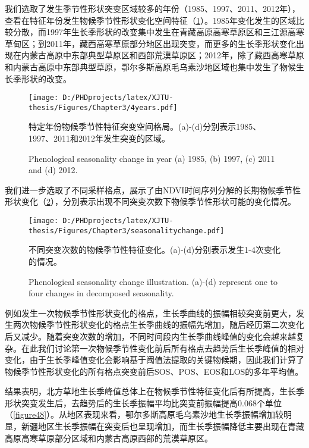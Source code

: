 我们选取了发生季节性形状突变区域较多的年份（1985、1997、2011、2012年），查看在特征年份发生物候季节性形状变化空间特征（\cref{figure46}）。1985年变化发生的区域比较分散，而1997年生长季形状的改变集中发生在青藏高原高寒草原区和三江源高寒草甸区；到2011年，藏西高寒草原部分地区出现突变，而更多的生长季形状变化出现在内蒙古高原中东部典型草原区和西部荒漠草原区；2012年，除了藏西高寒草原和内蒙古高原中东部典型草原，鄂尔多斯高原毛乌素沙地区域也集中发生了物候生长季形状的改变。

\begin{figure}[H]
  \centering
  \texttt{[image: D:/PHDprojects/latex/XJTU-thesis/Figures/Chapter3/4years.pdf]}
  \caption{特定年份物候季节性特征突变空间格局。(a)-(d)分别表示1985、1997、2011和2012年发生突变的区域。}
  \addtocounter{figure}{-1}
  \vspace{5pt}
  \renewcommand{\figurename}{Fig}
  \caption{Phenological seasonality change in year (a) 1985, (b) 1997, (c) 2011 and (d) 2012.}
  \label{figure46}
\end{figure}



我们进一步选取了不同采样格点，展示了由NDVI时间序列分解的长期物候季节性形状变化（\cref{figure47}），分别表示出现不同突变次数下物候季节性形状可能的变化情况。

\begin{figure}[h]
  \centering
  \texttt{[image: D:/PHDprojects/latex/XJTU-thesis/Figures/Chapter3/seasonalitychange.pdf]}
  \caption{不同突变次数的物候季节性特征变化。(a)-(d)分别表示发生1-4次变化的情况。}
  \addtocounter{figure}{-1}
  \vspace{5pt}
  \renewcommand{\figurename}{Fig}
  \caption{Phenological seasonality change illustration. (a)-(d) represent one to four changes in decomposed seasonality.}
  \label{figure47}
\end{figure}

例如发生一次物候季节性形状变化的格点，生长季曲线的振幅相较突变前更大，发生两次物候季节性形状变化的格点生长季曲线的振幅先增加，随后经历第二次变化后又减少。随着突变次数的增加，不同时间段内生长季曲线峰值的变化会越来越复杂。在此我们讨论第一次物候季节性变化前后所有格点去趋势后生长季峰值的相对变化，由于生长季峰值变化会影响基于阈值法提取的关键物候期，因此我们计算了物候季节性形状变化的所有格点突变前后SOS、POS、EOS和LOS的多年平均值。

结果表明，北方草地生长季峰值总体上在物候季节性特征变化后有所提高，生长季形状突变发生后，去趋势后的生长季振幅平均比突变前振幅提高0.068个单位（\cref{figure48}）。从地区表现来看，鄂尔多斯高原毛乌素沙地生长季振幅增加较明显，新疆地区生长季振幅在突变后也呈现增加，而生长季振幅降低主要出现在青藏高原高寒草原部分区域和内蒙古高原西部的荒漠草原区。

